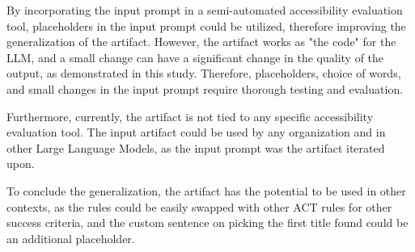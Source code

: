 By incorporating the input prompt in a semi-automated accessibility evaluation tool, placeholders in the input prompt could be utilized, therefore improving the generalization of the artifact. However, the artifact works as "the code" for the LLM, and a small change can have a significant change in the quality of the output, as demonstrated in this study. Therefore, placeholders, choice of words, and small changes in the input prompt require thorough testing and evaluation.

Furthermore, currently, the artifact is not tied to any specific accessibility evaluation tool. The input artifact could be used by any organization and in other Large Language Models, as the input prompt was the artifact iterated upon.

To conclude the generalization, the artifact has the potential to be used in other contexts, as the rules could be easily swapped with other ACT rules for other success criteria, and the custom sentence on picking the first title found could be an additional placeholder.
